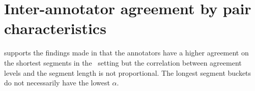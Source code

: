 \section{Inter-annotator agreement by pair characteristics}\label{appendix:IAA_expanded}

 supports the findings made in  that the annotators have a higher agreement on the shortest segments in the \sxs~setting but the correlation between agreement levels and the segment length is not proportional. The longest segment buckets do not necessarily have the lowest $\alpha$.

\begin{table}[htbp]
    \fontsize{5}{6}\selectfont
    \centering
    \caption{Krippendorff's $\alpha$ values for annotators' agreement across three equally sized segment groups of different average token lengths. Shorter segments elicit higher agreement in the \sxs~settings.
    }
    \label{tab:inter-AA-3-buckets}
\end{table}

